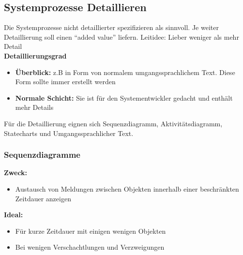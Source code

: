 \subsection{Systemprozesse Detaillieren }
Die Systemprozesse nicht detaillierter spezifizieren als sinnvoll. Je weiter Detaillierung soll einen "`added value"' liefern. 
Leitidee: Lieber weniger als mehr Detail\\

\textbf{Detaillierungsgrad}
\begin{itemize}
	\item \textbf{Überblick: } z.B in Form von normalem umgangssprachlichem Text. Diese Form sollte immer erstellt werden
	\item \textbf{Normale Schicht: } Sie ist für den Systementwickler gedacht und enthält mehr Details  
\end{itemize}

Für die Detaillierung eignen sich Sequenzdiagramm, Aktivitätsdiagramm, Statecharts und Umgangssprachlicher Text.

\subsubsection{Sequenzdiagramme }

\begin{multicols}{2}
	\textbf{Zweck:}
	\begin{itemize}
		\item Austausch von Meldungen zwischen Objekten innerhalb einer beschränkten Zeitdauer anzeigen
	\end{itemize}
	\columnbreak
	
	\textbf{Ideal:}
	\begin{itemize}
		\item Für kurze Zeitdauer mit einigen wenigen Objekten
		\item Bei wenigen Verschachtlungen und Verzweigungen
	\end{itemize}
\end{multicols}

